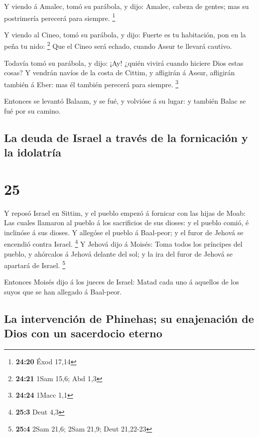  Y viendo á Amalec, tomó su parábola, y dijo: Amalec,
cabeza de gentes; mas su postrimería perecerá para siempre. \footnote{\textbf{24:20}
  Éxod 17,14}

 Y viendo al Cineo, tomó su parábola, y dijo: Fuerte es
tu habitación, pon en la peña tu nido: \footnote{\textbf{24:21} 1Sam
  15,6; Abd 1,3}  Que el Cineo será echado, cuando Assur
te llevará cautivo.

 Todavía tomó su parábola, y dijo: ¡Ay! ¿quién vivirá
cuando hiciere Dios estas cosas?  Y vendrán navíos de la
costa de Cittim, y afligirán á Assur, afligirán también á Eber: mas él
también perecerá para siempre. \footnote{\textbf{24:24} 1Macc 1,1}

 Entonces se levantó Balaam, y se fué, y volvióse á su
lugar: y también Balac se fué por su camino.

\hypertarget{la-deuda-de-israel-a-travuxe9s-de-la-fornicaciuxf3n-y-la-idolatruxeda}{%
\subsection{La deuda de Israel a través de la fornicación y la
idolatría}\label{la-deuda-de-israel-a-travuxe9s-de-la-fornicaciuxf3n-y-la-idolatruxeda}}

\hypertarget{section-24}{%
\section{25}\label{section-24}}

 Y reposó Israel en Sittim, y el pueblo empezó á fornicar
con las hijas de Moab:  Las cuales llamaron al pueblo á
los sacrificios de sus dioses: y el pueblo comió, é inclinóse á sus
dioses.  Y allegóse el pueblo á Baal-peor; y el furor de
Jehová se encendió contra Israel. \footnote{\textbf{25:3} Deut 4,3}
 Y Jehová dijo á Moisés: Toma todos los príncipes del
pueblo, y ahórcalos á Jehová delante del sol; y la ira del furor de
Jehová se apartará de Israel. \footnote{\textbf{25:4} 2Sam 21,6; 2Sam
  21,9; Deut 21,22-23}

 Entonces Moisés dijo á los jueces de Israel: Matad cada
uno á aquellos de los suyos que se han allegado á Baal-peor.

\hypertarget{la-intervenciuxf3n-de-phinehas-su-enajenaciuxf3n-de-dios-con-un-sacerdocio-eterno}{%
\subsection{La intervención de Phinehas; su enajenación de Dios con un
sacerdocio
eterno}\label{la-intervenciuxf3n-de-phinehas-su-enajenaciuxf3n-de-dios-con-un-sacerdocio-eterno}}

